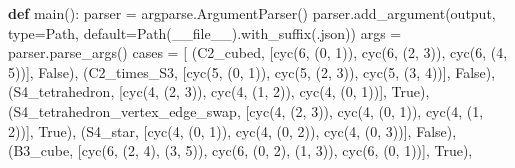 \documentclass[
  10pt,
  letterpaper,
]{article}
\newenvironment{Shaded}{}{}
\newcommand{\BuiltInTok}[1]{\textcolor[rgb]{0.00,0.50,0.00}{#1}}
\newcommand{\DecValTok}[1]{\textcolor[rgb]{0.25,0.63,0.44}{#1}}
\newcommand{\KeywordTok}[1]{\textcolor[rgb]{0.00,0.44,0.13}{\textbf{#1}}}
\newcommand{\NormalTok}[1]{#1}
\newcommand{\OperatorTok}[1]{\textcolor[rgb]{0.40,0.40,0.40}{#1}}
\newcommand{\StringTok}[1]{\textcolor[rgb]{0.25,0.44,0.63}{#1}}
\newcommand{\VariableTok}[1]{\textcolor[rgb]{0.10,0.09,0.49}{#1}}
\begin{document}
\begin{Shaded}
\begin{Highlighting}[]
\KeywordTok{def}\NormalTok{ main():}
\NormalTok{    parser }\OperatorTok{=}\NormalTok{ argparse.ArgumentParser()}
\NormalTok{    parser.add\_argument(}\StringTok{\textquotesingle{}{-}{-}output\textquotesingle{}}\NormalTok{, }\BuiltInTok{type}\OperatorTok{=}\NormalTok{Path, default}\OperatorTok{=}\NormalTok{Path(}\VariableTok{\_\_file\_\_}\NormalTok{).with\_suffix(}\StringTok{\textquotesingle{}.json\textquotesingle{}}\NormalTok{))}
\NormalTok{    args }\OperatorTok{=}\NormalTok{ parser.parse\_args()}
\NormalTok{    cases }\OperatorTok{=}\NormalTok{ [}
\NormalTok{        (}\StringTok{\textquotesingle{}C2\_cubed\textquotesingle{}}\NormalTok{, [cyc(}\DecValTok{6}\NormalTok{, (}\DecValTok{0}\NormalTok{, }\DecValTok{1}\NormalTok{)), cyc(}\DecValTok{6}\NormalTok{, (}\DecValTok{2}\NormalTok{, }\DecValTok{3}\NormalTok{)), cyc(}\DecValTok{6}\NormalTok{, (}\DecValTok{4}\NormalTok{, }\DecValTok{5}\NormalTok{))], }\VariableTok{False}\NormalTok{),}
\NormalTok{        (}\StringTok{\textquotesingle{}C2\_times\_S3\textquotesingle{}}\NormalTok{, [cyc(}\DecValTok{5}\NormalTok{, (}\DecValTok{0}\NormalTok{, }\DecValTok{1}\NormalTok{)), cyc(}\DecValTok{5}\NormalTok{, (}\DecValTok{2}\NormalTok{, }\DecValTok{3}\NormalTok{)), cyc(}\DecValTok{5}\NormalTok{, (}\DecValTok{3}\NormalTok{, }\DecValTok{4}\NormalTok{))], }\VariableTok{False}\NormalTok{),}
\NormalTok{        (}\StringTok{\textquotesingle{}S4\_tetrahedron\textquotesingle{}}\NormalTok{, [cyc(}\DecValTok{4}\NormalTok{, (}\DecValTok{2}\NormalTok{, }\DecValTok{3}\NormalTok{)), cyc(}\DecValTok{4}\NormalTok{, (}\DecValTok{1}\NormalTok{, }\DecValTok{2}\NormalTok{)), cyc(}\DecValTok{4}\NormalTok{, (}\DecValTok{0}\NormalTok{, }\DecValTok{1}\NormalTok{))], }\VariableTok{True}\NormalTok{),}
\NormalTok{        (}\StringTok{\textquotesingle{}S4\_tetrahedron\_vertex\_edge\_swap\textquotesingle{}}\NormalTok{, [cyc(}\DecValTok{4}\NormalTok{, (}\DecValTok{2}\NormalTok{, }\DecValTok{3}\NormalTok{)), cyc(}\DecValTok{4}\NormalTok{, (}\DecValTok{0}\NormalTok{, }\DecValTok{1}\NormalTok{)), cyc(}\DecValTok{4}\NormalTok{, (}\DecValTok{1}\NormalTok{, }\DecValTok{2}\NormalTok{))], }\VariableTok{True}\NormalTok{),}
\NormalTok{        (}\StringTok{\textquotesingle{}S4\_star\textquotesingle{}}\NormalTok{, [cyc(}\DecValTok{4}\NormalTok{, (}\DecValTok{0}\NormalTok{, }\DecValTok{1}\NormalTok{)), cyc(}\DecValTok{4}\NormalTok{, (}\DecValTok{0}\NormalTok{, }\DecValTok{2}\NormalTok{)), cyc(}\DecValTok{4}\NormalTok{, (}\DecValTok{0}\NormalTok{, }\DecValTok{3}\NormalTok{))], }\VariableTok{False}\NormalTok{),}
\NormalTok{        (}\StringTok{\textquotesingle{}B3\_cube\textquotesingle{}}\NormalTok{, [cyc(}\DecValTok{6}\NormalTok{, (}\DecValTok{2}\NormalTok{, }\DecValTok{4}\NormalTok{), (}\DecValTok{3}\NormalTok{, }\DecValTok{5}\NormalTok{)), cyc(}\DecValTok{6}\NormalTok{, (}\DecValTok{0}\NormalTok{, }\DecValTok{2}\NormalTok{), (}\DecValTok{1}\NormalTok{, }\DecValTok{3}\NormalTok{)), cyc(}\DecValTok{6}\NormalTok{, (}\DecValTok{0}\NormalTok{, }\DecValTok{1}\NormalTok{))], }\VariableTok{True}\NormalTok{),}

\end{Highlighting}
\end{Shaded}
\end{document}
